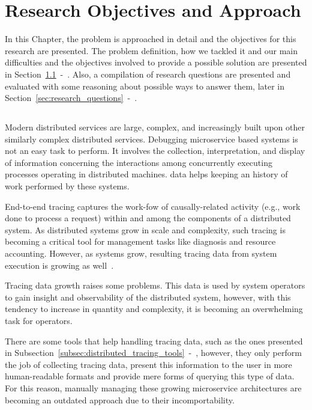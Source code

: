 \glsresetall
\chapter{Research Objectives and Approach}
\label{chap:research_objectives_and_approach}

In this Chapter, the problem is approached in detail and the objectives for this research are presented. The problem definition, how we tackled it and our main difficulties and the objectives involved to provide a possible solution are presented in Section~\ref{sec:problem_definition}~-~. Also, a compilation of research questions are presented and evaluated with some reasoning about possible ways to answer them, later in Section~\ref{sec:research_questions}~-~.

\section{}
\label{sec:problem_definition}

Modern distributed services are large, complex, and increasingly built upon other similarly complex distributed services. Debugging microservice based systems is not an easy task to perform. It involves the collection, interpretation, and display of information concerning the interactions among concurrently executing processes operating in distributed machines.  data helps keeping an history of work performed by these systems.

End-to-end tracing captures the work-fow of causally-related activity (e.g., work done to process a request) within and among the components of a distributed system. As distributed systems grow in scale and complexity, such tracing is becoming a critical tool for management tasks like diagnosis and resource accounting. However, as systems grow, resulting tracing data from system execution is growing as well~\cite{Sambasivan2014}.

Tracing data growth raises some problems. This data is used by system operators to gain insight and observability of the distributed system, however, with this tendency to increase in quantity and complexity, it is becoming an overwhelming task for operators.

There are some tools that help handling tracing data, such as the ones presented in Subsection~\ref{subsec:distributed_tracing_tools}~-~, however, they only perform the job of collecting tracing data, present this information to the user in more human-readable formats and provide mere forms of querying this type of data. For this reason, manually managing these growing microservice architectures are becoming an outdated approach due to their incomportability.

